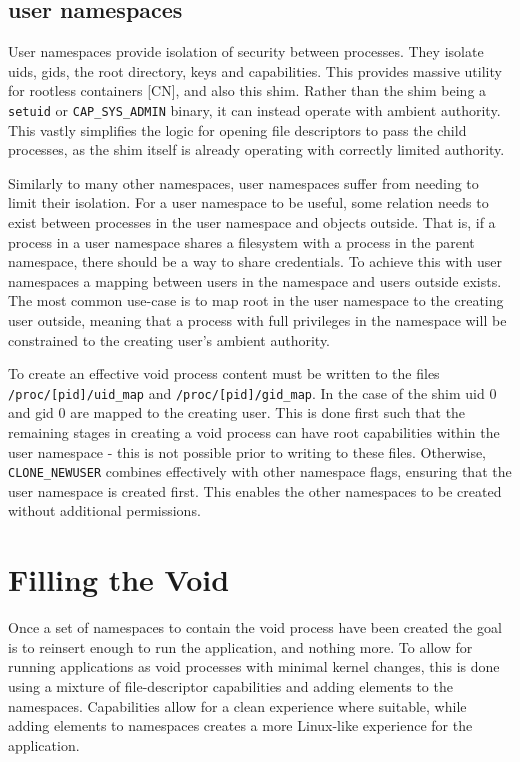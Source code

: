 \documentclass[sigplan]{acmart}
\begin{document}
\subsection{user namespaces}

User namespaces provide isolation of security between processes. They isolate uids, gids, the root directory, keys and capabilities. This provides massive utility for rootless containers [CN], and also this shim. Rather than the shim being a \texttt{setuid} or \texttt{CAP\_SYS\_ADMIN} binary, it can instead operate with ambient authority. This vastly simplifies the logic for opening file descriptors to pass the child processes, as the shim itself is already operating with correctly limited authority.

Similarly to many other namespaces, user namespaces suffer from needing to limit their isolation. For a user namespace to be useful, some relation needs to exist between processes in the user namespace and objects outside. That is, if a process in a user namespace shares a filesystem with a process in the parent namespace, there should be a way to share credentials. To achieve this with user namespaces a mapping between users in the namespace and users outside exists. The most common use-case is to map root in the user namespace to the creating user outside, meaning that a process with full privileges in the namespace will be constrained to the creating user's ambient authority.

To create an effective void process content must be written to the files \texttt{/proc/[pid]/uid\_map} and \texttt{/proc/[pid]/gid\_map}. In the case of the shim uid 0 and gid 0 are mapped to the creating user. This is done first such that the remaining stages in creating a void process can have root capabilities within the user namespace - this is not possible prior to writing to these files. Otherwise, \texttt{CLONE\_NEWUSER} combines effectively with other namespace flags, ensuring that the user namespace is created first. This enables the other namespaces to be created without additional permissions.


\section{Filling the Void}

Once a set of namespaces to contain the void process have been created the goal is to reinsert enough to run the application, and nothing more. To allow for running applications as void processes with minimal kernel changes, this is done using a mixture of file-descriptor capabilities and adding elements to the namespaces. Capabilities allow for a clean experience where suitable, while adding elements to namespaces creates a more Linux-like experience for the application.
\end{document}
